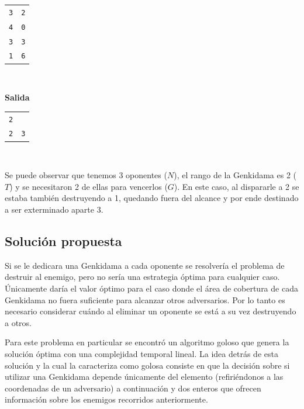 	\begin{tabular}{ll}
		\texttt{3} & \texttt{2} \\
		\texttt{4} & \texttt{0} \\
		\texttt{3} & \texttt{3} \\
		\texttt{1} & \texttt{6} \\
	\end{tabular}

	~

	\textbf{Salida}

	\begin{tabular}{ll}
		\texttt{2} & \\
		\texttt{2} & \texttt{3} \\
	\end{tabular}

	~

	Se puede observar que tenemos 3 oponentes ($N$), el rango de la
	Genkidama es 2 ($T$) y se necesitaron 2 de ellas para vencerlos ($G$). En este caso, al
	dispararle a 2 se estaba también destruyendo a 1, quedando fuera del alcance
	y por ende destinado a ser exterminado aparte 3.

    \subsection{Solución propuesta}

	Si se le dedicara una Genkidama a cada oponente se resolvería el problema de
	destruir al enemigo, pero no sería una estrategia óptima para cualquier
	caso. Únicamente daría el valor óptimo para el caso donde el área de cobertura de cada
	Genkidama no fuera suficiente para alcanzar otros adversarios. Por lo tanto
	es necesario considerar cuándo al eliminar un oponente se está a su vez
	destruyendo a otros.

	Para este problema en particular se encontró un algoritmo goloso que genera
	la solución óptima con una complejidad temporal lineal. La idea detrás de
	esta solución y la cual la caracteriza como golosa consiste en que la
	decisión sobre si utilizar una Genkidama depende únicamente del
	elemento (refiriéndonos a las coordenadas de un adversario) a continuación y dos
	enteros que ofrecen información sobre los enemigos recorridos anteriormente.

